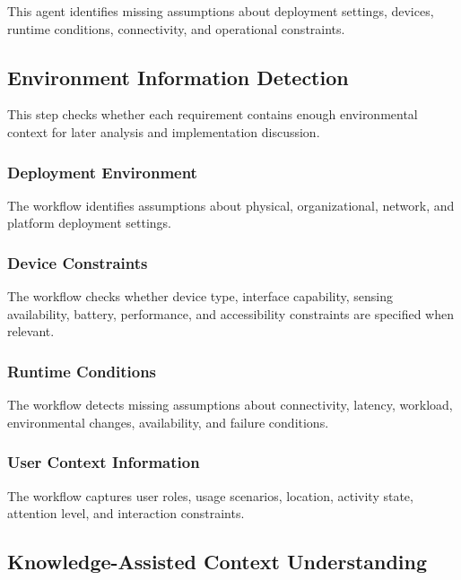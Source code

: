 This agent identifies missing assumptions about deployment settings, devices, runtime conditions, connectivity, and operational constraints.

\subsection{Environment Information Detection}
\label{method:environment_detection}

This step checks whether each requirement contains enough environmental context for later analysis and implementation discussion.

\subsubsection{Deployment Environment}
\label{method:deployment_environment}

The workflow identifies assumptions about physical, organizational, network, and platform deployment settings.

\subsubsection{Device Constraints}
\label{method:device_constraints}

The workflow checks whether device type, interface capability, sensing availability, battery, performance, and accessibility constraints are specified when relevant.

\subsubsection{Runtime Conditions}
\label{method:runtime_conditions}

The workflow detects missing assumptions about connectivity, latency, workload, environmental changes, availability, and failure conditions.

\subsubsection{User Context Information}
\label{method:user_context}

The workflow captures user roles, usage scenarios, location, activity state, attention level, and interaction constraints.

\subsection{Knowledge-Assisted Context Understanding}
\label{method:knowledge_assisted}

